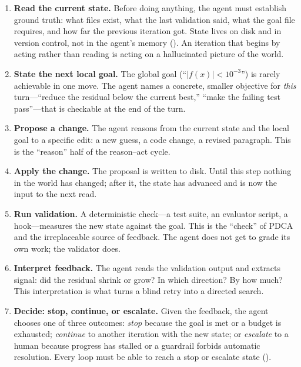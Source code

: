 \begin{enumerate}
  \item \textbf{Read the current state.} Before doing anything, the agent must
        establish ground truth: what files exist, what the last validation said,
        what the goal file requires, and how far the previous iteration got.
        State lives on disk and in version control, not in the agent's memory
        (). An iteration that begins by acting
        rather than reading is acting on a hallucinated picture of the world.
  \item \textbf{State the next local goal.} The global goal (``$|f(x)| < 10^{-3}$'')
        is rarely achievable in one move. The agent names a concrete, smaller
        objective for \emph{this} turn---``reduce the residual below the current
        best,'' ``make the failing test pass''---that is checkable at the end of
        the turn.
  \item \textbf{Propose a change.} The agent reasons from the current state and
        the local goal to a specific edit: a new guess, a code change, a revised
        paragraph. This is the ``reason'' half of the reason--act cycle.
  \item \textbf{Apply the change.} The proposal is written to disk. Until this
        step nothing in the world has changed; after it, the state has advanced
        and is now the input to the next read.
  \item \textbf{Run validation.} A deterministic check---a test suite, an
        evaluator script, a hook---measures the new state against the goal. This
        is the ``check'' of PDCA and the irreplaceable source of feedback. The
        agent does not get to grade its own work; the validator does.
  \item \textbf{Interpret feedback.} The agent reads the validation output and
        extracts signal: did the residual shrink or grow? In which direction? By
        how much? This interpretation is what turns a blind retry into a directed
        search.
  \item \textbf{Decide: stop, continue, or escalate.} Given the feedback, the
        agent chooses one of three outcomes: \emph{stop} because the goal is met
        or a budget is exhausted; \emph{continue} to another iteration with the
        new state; or \emph{escalate} to a human because progress has stalled or
        a guardrail forbids automatic resolution. Every loop must be able to
        reach a stop or escalate state ().
\end{enumerate}

